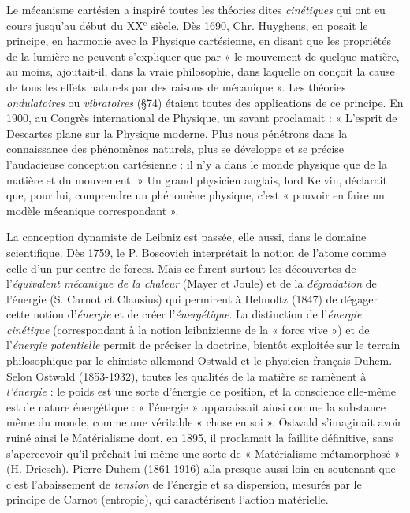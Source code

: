 \vspace{0.24cm}
{\footnotesize Le mécanisme cartésien a inspiré toutes les théories dites \textsf{\textit {cinétiques}} qui
ont eu cours jusqu’au début du {\footnotesize XX}$^\text{e}$ siècle.
Dès 1690, Chr. Huyghens, en
posait le principe, en harmonie avec la Physique cartésienne, en disant que
les propriétés de la lumière ne peuvent s'expliquer que par « le mouvement
de quelque matière, au moins, ajoutait-il, dans la vraie philosophie, dans
laquelle on conçoit la cause de tous les effets naturels par des raisons de
mécanique ». Les théories {\it ondulatoires} ou {\it vibratoires} (\S 74) étaient toutes
des applications de ce principe. En 1900, au Congrès international de
Physique, un savant proclamait : « L'esprit de Descartes plane sur la
Physique moderne. Plus nous pénétrons dans la connaissance des phénomènes
naturels, plus se développe et se précise l’audacieuse conception
cartésienne : il n’y a dans le monde physique que de la matière et du mouvement. »
Un grand physicien anglais, lord Kelvin, déclarait que, pour lui,
comprendre un phénomène physique, c'est « pouvoir en faire un modèle
mécanique correspondant ».

La conception dynamiste de Leibniz est passée, elle aussi, dans le domaine
scientifique. Dès 1759, le P. Boscovich interprétait la notion de l'atome
comme celle d’un pur centre de forces. Mais ce furent surtout les découvertes
de l'{\it équivalent mécanique de la chaleur} (Mayer et Joule) et de la {\it dégradation}
de l'énergie (S. Carnot ct Clausius) qui permirent à Helmoltz (1847) de
dégager cette notion d'{\it énergie} et de créer l'\textsf{\textit {énergétique}}. La distinction de
l'{\it énergie cinétique} (correspondant à la notion leibnizienne de la « force vive »)
et de l'{\it énergie potentielle} permit de préciser la doctrine, bientôt exploitée
sur le terrain philosophique par le chimiste allemand Ostwald et le physicien
français Duhem. Selon Ostwald (1853-1932), toutes les qualités de la
matière se ramènent à {\it l'énergie} : le poids est une sorte d'énergie de position,
et la conscience elle-même est de nature énergétique : « l'énergie » apparaissait
ainsi comme la substance même du monde, comme une véritable
« chose en soi ». Ostwald s’imaginait avoir ruiné ainsi le Matérialisme dont,
en 1895, il proclamait la faillite définitive, sans s’apercevoir qu'il prêchait
lui-même une sorte de « Matérialisme métamorphosé » (H. Driesch). Pierre
Duhem (1861-1916) alla presque aussi loin en soutenant que c'est l'abaissement
de {\it tension} de l'énergie et sa dispersion, mesurés par le principe de
Carnot (entropie), qui caractérisent l’action matérielle.

}
